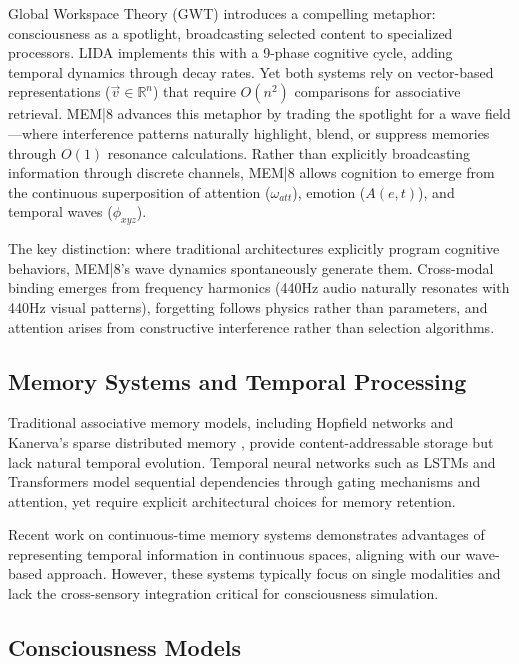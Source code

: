 \documentclass[11pt,letterpaper]{article}
\begin{document}
Global Workspace Theory (GWT) \cite{baars1988cognitive} introduces a compelling metaphor: consciousness as a spotlight, broadcasting selected content to specialized processors. LIDA \cite{franklin2007lida} implements this with a 9-phase cognitive cycle, adding temporal dynamics through decay rates. Yet both systems rely on vector-based representations ($\vec{v} \in \mathbb{R}^n$) that require $O(n^2)$ comparisons for associative retrieval. MEM|8 advances this metaphor by trading the spotlight for a wave field—where interference patterns naturally highlight, blend, or suppress memories through $O(1)$ resonance calculations. Rather than explicitly broadcasting information through discrete channels, MEM|8 allows cognition to emerge from the continuous superposition of attention ($\omega_{att}$), emotion ($A(e,t)$), and temporal waves ($\phi_{xyz}$).

The key distinction: where traditional architectures explicitly program cognitive behaviors, MEM|8's wave dynamics spontaneously generate them. Cross-modal binding emerges from frequency harmonics (440Hz audio naturally resonates with 440Hz visual patterns), forgetting follows physics rather than parameters, and attention arises from constructive interference rather than selection algorithms.

\subsection{Memory Systems and Temporal Processing}

Traditional associative memory models, including Hopfield networks \cite{hopfield1982neural} and Kanerva's sparse distributed memory \cite{kanerva1988sparse}, provide content-addressable storage but lack natural temporal evolution. Temporal neural networks such as LSTMs \cite{hochreiter1997long} and Transformers \cite{vaswani2017attention} model sequential dependencies through gating mechanisms and attention, yet require explicit architectural choices for memory retention.

Recent work on continuous-time memory systems \cite{voelker2019legendre} demonstrates advantages of representing temporal information in continuous spaces, aligning with our wave-based approach. However, these systems typically focus on single modalities and lack the cross-sensory integration critical for consciousness simulation.

\subsection{Consciousness Models}
\end{document}
